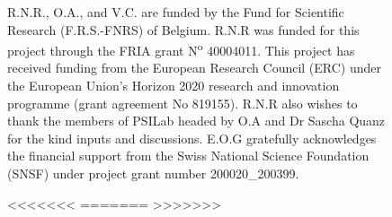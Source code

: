 \documentclass{aa}
\begin{document}
{{{\begin{figure}
{\begin{acknowledgements}
R.N.R., O.A., and V.C. are funded by the Fund for Scientific Research (F.R.S.-FNRS) of Belgium. 
R.N.R was funded for this project through the FRIA grant N\textsuperscript{o}	40004011. This project has received funding from the European Research Council (ERC) under the European Union's Horizon 2020 research and innovation programme (grant agreement No 819155). R.N.R also wishes to thank the members of PSILab headed by O.A and Dr Sascha Quanz for the kind inputs and discussions. E.O.G gratefully acknowledges the financial support from the Swiss National Science Foundation (SNSF) under project grant number 200020\_200399.
\end{acknowledgements}



<<<<<<<
=======
>>>>>>>

}
\end{figure}}}}
\end{document}
